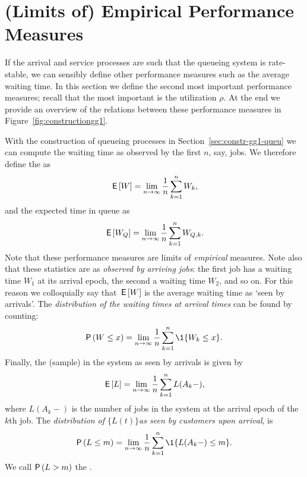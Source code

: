 \section{(Limits of) Empirical Performance Measures}
\label{sec:limits-of-emperical}




If the arrival and service processes are such that the queueing system is rate-stable, we can sensibly define other performance measures such as the average waiting time.
In this section we define the second most important performance measures; recall that the most important is the utilization $\rho$.
At the end we provide an overview of the relations between these performance measures in Figure~\ref{fig:constructiongg1}.


With the construction of queueing processes in Section~\ref{sec:constr-gg1-queu} we can compute the waiting time as observed by the first $n$, say, jobs.
We therefore define the  as
\begin{equation}\label{eq:49}
  \,\mathsf{E}\left[W\right] = \lim_{n\to\infty} \frac 1n\sum_{k=1}^n W_k,
\end{equation}
and the expected time in queue as
\begin{equation}\label{eq:50}
  \,\mathsf{E}\left[W_Q\right] = \lim_{n\to\infty} \frac 1 n\sum_{k=1}^n W_{Q,k}.
\end{equation}
Note that these performance measures are limits of \emph{empirical} measures.
Note also that these statistics are as \emph{observed by arriving jobs}: the first job has a waiting time $W_1$ at its arrival epoch, the second a waiting time $W_2$, and so on.
For this reason we colloquially say that $\,\mathsf{E}\left[W\right]$ is the average waiting time as `seen by arrivals'.
The \emph{distribution of the waiting times at arrival times} can be found by counting:
\begin{equation}\label{eq:48}
  \P{W \leq x}  = \lim_{n\to\infty} \frac 1n\sum_{k=1}^n \1{W_k\leq x}.
\end{equation}
Finally, the (sample)  in the system as seen by arrivals is given by
\begin{equation}\label{eq:EQ}
\,\mathsf{E}\left[L\right] =  \lim_{n\to\infty}\frac 1 n \sum_{k=1}^n L(A_k-),
\end{equation}
where $L(A_k-)$ is the number of jobs in the system at the arrival epoch of the $k$th job.
The \emph{distribution of $\{L(t)\}$as seen by customers upon arrival}, is
\begin{equation}\label{eq:Qm}
\P{L\leq m} = \lim_{n\to\infty} \frac 1 n \sum_{k=1}^n \1{L(A_k-) \leq m}.
\end{equation}
We call $\P{L > m}$ the .



